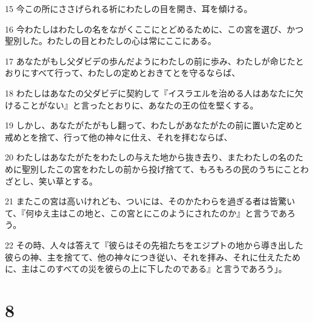 \par 15 今この所にささげられる祈にわたしの目を開き、耳を傾ける。
\par 16 今わたしはわたしの名をながくここにとどめるために、この宮を選び、かつ聖別した。わたしの目とわたしの心は常にここにある。
\par 17 あなたがもし父ダビデの歩んだようにわたしの前に歩み、わたしが命じたとおりにすべて行って、わたしの定めとおきてとを守るならば、
\par 18 わたしはあなたの父ダビデに契約して『イスラエルを治める人はあなたに欠けることがない』と言ったとおりに、あなたの王の位を堅くする。
\par 19 しかし、あなたがたがもし翻って、わたしがあなたがたの前に置いた定めと戒めとを捨て、行って他の神々に仕え、それを拝むならば、
\par 20 わたしはあなたがたをわたしの与えた地から抜き去り、またわたしの名のために聖別したこの宮をわたしの前から投げ捨てて、もろもろの民のうちにことわざとし、笑い草とする。
\par 21 またこの宮は高いけれども、ついには、そのかたわらを過ぎる者は皆驚いて、『何ゆえ主はこの地と、この宮とにこのようにされたのか』と言うであろう。
\par 22 その時、人々は答えて『彼らはその先祖たちをエジプトの地から導き出した彼らの神、主を捨てて、他の神々につき従い、それを拝み、それに仕えたために、主はこのすべての災を彼らの上に下したのである』と言うであろう」。

\chapter{8}

